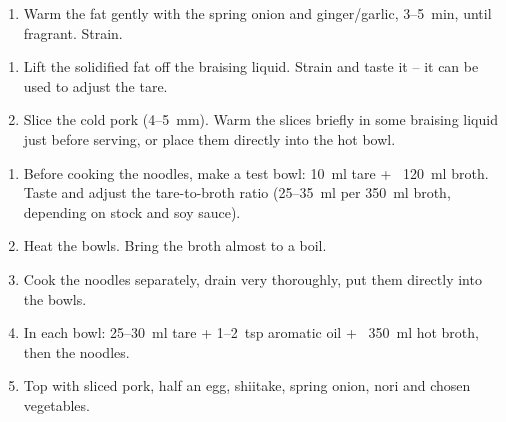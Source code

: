 
\begin{ingredients}
\end{ingredients}

\begin{recipe}
  \begin{enumerate}

  \item Warm the fat gently with the spring onion and ginger/garlic,
    3--5~min, until fragrant. Strain.

  \end{enumerate}
\end{recipe}



\begin{recipe}
  \begin{enumerate}

  \item Lift the solidified fat off the braising liquid. Strain and
    taste it -- it can be used to adjust the tare.

  \item Slice the cold pork (4--5~mm). Warm the slices briefly in
    some braising liquid just before serving, or place them directly
    into the hot bowl.

  \end{enumerate}
\end{recipe}



\begin{ingredients}
\end{ingredients}

\begin{recipe}
  \begin{enumerate}

  \item Before cooking the noodles, make a test bowl: 10~ml tare +
    ~120~ml broth. Taste and adjust the tare-to-broth ratio
    (25--35~ml per 350~ml broth, depending on stock and soy sauce).

  \item Heat the bowls. Bring the broth almost to a boil.

  \item Cook the noodles separately, drain very thoroughly, put them
    directly into the bowls.

  \item In each bowl: 25--30~ml tare + 1--2~tsp aromatic oil + ~350~ml
    hot broth, then the noodles.

  \item Top with sliced pork, half an egg, shiitake, spring onion,
    nori and chosen vegetables.

  \end{enumerate}
\end{recipe}

